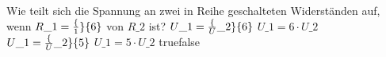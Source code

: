     {Wie teilt sich die Spannung an zwei in Reihe geschalteten Widerständen auf, wenn $R\_1 = \frac\{1\}\{6\}$ von $R\_2$ ist? }
    {$U\_1 = \frac\{U\_2\}\{6\}$}
    {$U\_1 = 6\cdot U\_2$}
    {$U\_1 = \frac\{U\_2\}\{5\}$}
    {$U\_1 = 5\cdot U\_2$}
    {true}{false}